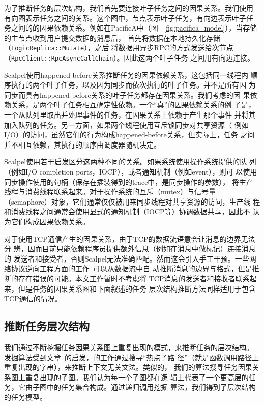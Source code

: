 
为了推断任务的层次结构，我们首先要连接叶子任务之间的因果关系。我们使用
有向图表示任务之间的关系。这个图中，节点表示叶子任务，有向边表示叶子任
务之间的的因果依赖关系。例如在PacificA中（图
~\ref{fig:pacifica_model}），当存储的主节点收到用户提交数据的消息后，
首先将数据在本地持久化存储（\texttt{Logic\-Replica\-::Mutate}），之后
将数据用异步RPC的方式发送给次节点
（\texttt{Rpc\-Client\-::RpcAsync\-Call\-Chain}）。因此这两个叶子任务
之间用有向边连接。

Scalpel使用happened-before关系推断任务的因果依赖关系，这包括同一线程内
顺序执行的两个叶子任务，以及因为同步而依次执行的叶子任务。并不是所有因
为同步而具有happened-before关系的叶子任务都存在因果关系。我们考虑的因
果依赖关系，是两个叶子任务相互确定性依赖。一个“真”的因果依赖关系的例
子是，一个从队列里取出并处理事件的任务，在因果关系上依赖于产生那个事件
并将其加入队列的任务。另一方面，如果两个线程使用互斥锁同步对共享资源（
例如I/O）的访问，虽然它们的行为构成happened-before关系，但实际上，任务
之间并不相互依赖，其执行的顺序由调度器随机决定。

Scalpel使用若干启发区分这两种不同的关系。如果系统使用操作系统提供的队
列（例如I/O completion ports，IOCP），或者通知机制（例如event），则可
以使用同步操作使用的句柄（保存在插装得到的trace中，是同步操作的参数），
将生产线程与消费线程联系起来。对于操作系统的互斥（mutex）与信号量
（semaphore）对象，它们通常仅仅被用来同步线程对共享资源的访问，生产线
程和消费线程之间通常会使用显式的通知机制（IOCP等）协调数据共享，因此不
认为它们构成因果依赖关系。

对于使用TCP通信产生的因果关系，由于TCP的数据流语意会让消息的边界无法分
辨，因而目前只能依赖程序员提供额外信息（例如在消息中做标记）连接消息的
发送者和接受者，否则Scalpel无法准确匹配。然而这会引入手工干预。一些网
络协议逆向工程方面的工作~\cite{Caballero2007, Cui2007}可以从数据流中自
动推断消息的边界与格式，但是推断的存在错误的可能。本文工作暂时不考虑将
TCP消息的发送者和接收者联系起来，但是任务的因果关系图和下面叙述的任务
层次结构推断方法同样适用于包含TCP通信的情况。

\subsection{推断任务层次结构}

我们通过不断挖掘任务因果关系图上重复出现的模式，来推断任务的层次结构。
发掘算法受到文章~\cite{wpp}的启发，\cite{wpp}的工作通过搜寻“热点子路
径”（就是函数调用路径上重复出现的字串），来推断上下文无关文法。类似的，
我们的算法搜寻任务因果关系图上重复出现的子图。我们认为每一个子图都在逻
辑上代表了一个更高层的任务，它由子图中的任务集合构成。通过递归调用挖掘
算法，我们得到了层次结构的任务模型。

